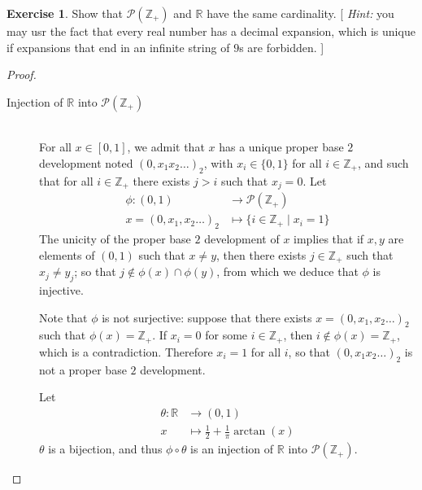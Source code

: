 \documentclass[11pt,a4paper,twoside]{article}
\theoremstyle{definition}
\newcounter{excounter}
\newtheorem{exercise}[excounter]{Exercise}
\begin{document}
\begin{exercise}

  Show that $\mathscr{P} ( \mathbb{Z}_+ )$ and $\mathbb{R}$ have the same cardinality.
  [ \emph{Hint:} you may usr the fact that every real number has a decimal expansion, which is unique if
  expansions that end in an infinite string of $9$s are forbidden. ]

\end{exercise}

\begin{proof}\hfill

  \begin{description}

    \item[Injection of $\mathbb{R}$ into $\mathscr{P} ( \mathbb{Z}_+ )$] \hspace{0pt}\\
      For all $x \in [ 0, 1 ]$, we admit that $x$ has a unique proper base $2$ development noted $\left( 0 , x_1 x_2 \dotsc \right)_2$,
      with $x_i \in \{ 0, 1 \}$ for all $i \in \mathbb{Z}_+$, and such that for all $i \in \mathbb{Z}_+$ there exists $j > i$ such that $x_j = 0$.
      Let
      \begin{align*}
        \phi : ( 0, 1 ) &\to \mathscr{P} ( \mathbb{Z}_+ ) \\
        x = \left( 0 , x_1, x_2 \dotsc \right)_2 &\mapsto \{ i \in \mathbb{Z}_+ \mid x_i = 1 \}
      \end{align*}
      The unicity of the proper base $2$ development of $x$ implies that if $x, y$ are elements of $( 0, 1 )$ such that $x \neq y$, then there exists $j \in \mathbb{Z}_+$
      such that $x_j \neq y_j$; so that $j \notin \phi ( x ) \cap \phi ( y )$, from which we deduce that $\phi$ is injective.

      Note that $\phi$ is not surjective: suppose that there exists $x = \left( 0, x_1, x_2 \dotsc \right)_2$ such that $\phi ( x ) = \mathbb{Z}_+$.
      If $x_i = 0$ for some $i \in \mathbb{Z}_+$, then $i \notin \phi ( x ) = \mathbb{Z}_+$, which is a contradiction. Therefore $x_i = 1$ for all $i$,
      so that $\left( 0 , x_1 x_2 \dotsc \right)_2$ is not a proper base $2$ development.

      Let
      \begin{align*} \label{def:bij_R_01}
        \theta : \mathbb{R} &\to ( 0, 1 ) \\
        x &\mapsto \frac{1}{2} + \frac{1}{\pi} \arctan \left( x \right)
      \end{align*}
      $\theta$ is a bijection, and thus $\phi \circ \theta$ is an injection of $\mathbb{R}$ into $\mathscr{P} ( \mathbb{Z}_+ )$.


\end{description}
\end{proof}
\end{document}
